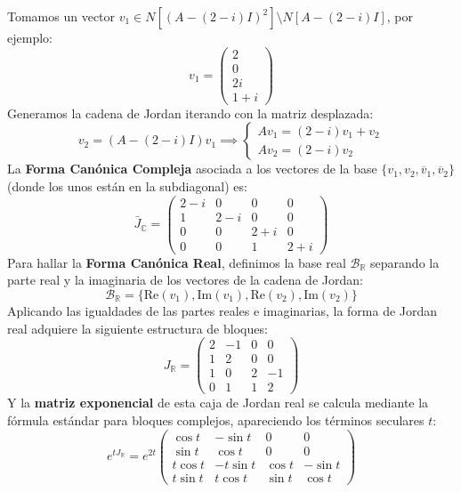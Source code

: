 {    Tomamos un vector $v_1 \in N[(A - (2-i)I)^2] \setminus N[A - (2-i)I]$, por ejemplo:
    \[
        v_1 = \begin{pmatrix} 2 \\ 0 \\ 2i \\ 1+i \end{pmatrix}
    \]
    Generamos la cadena de Jordan iterando con la matriz desplazada:
    \[
        v_2 = (A - (2-i)I)v_1 \implies \begin{cases} A v_1 = (2-i)v_1 + v_2 \\ A v_2 = (2-i)v_2 \end{cases}
    \]
    La \textbf{Forma Canónica Compleja} asociada a los vectores de la base $\{v_1, v_2, \overline{v}_1, \overline{v}_2\}$ (donde los unos están en la subdiagonal) es:
    \[
        \bar{J}_\mathbb{C} = \begin{pmatrix} 2-i & 0 & 0 & 0 \\ 1 & 2-i & 0 & 0 \\ 0 & 0 & 2+i & 0 \\ 0 & 0 & 1 & 2+i \end{pmatrix}
    \]
    Para hallar la \textbf{Forma Canónica Real}, definimos la base real $\mathcal{B}_\mathbb{R}$ separando la parte real y la imaginaria de los vectores de la cadena de Jordan:
    \[
        \mathcal{B}_\mathbb{R} = \{\text{Re}(v_1), \text{Im}(v_1), \text{Re}(v_2), \text{Im}(v_2)\}
    \]
    Aplicando las igualdades de las partes reales e imaginarias, la forma de Jordan real adquiere la siguiente estructura de bloques:
    \[
        J_\mathbb{R} = \begin{pmatrix} 2 & -1 & 0 & 0 \\ 1 & 2 & 0 & 0 \\ 1 & 0 & 2 & -1 \\ 0 & 1 & 1 & 2 \end{pmatrix}
    \]
    Y la \textbf{matriz exponencial} de esta caja de Jordan real se calcula mediante la fórmula estándar para bloques complejos, apareciendo los términos seculares $t$:
    \[
        e^{t J_\mathbb{R}} = e^{2t} \begin{pmatrix} \cos t & -\sin t & 0 & 0 \\ \sin t & \cos t & 0 & 0 \\ t\cos t & -t\sin t & \cos t & -\sin t \\ t\sin t & t\cos t & \sin t & \cos t \end{pmatrix}
    \]
}

